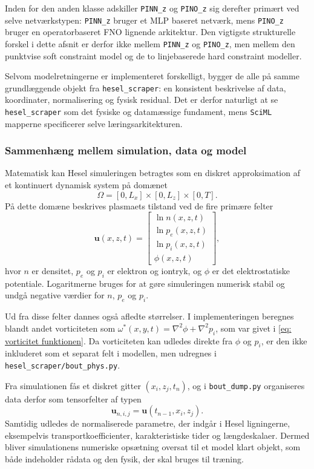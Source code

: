 Inden for den anden klasse adskiller \texttt{PINN\_z} og \texttt{PINO\_z} sig derefter primært ved selve netværkstypen: \texttt{PINN\_z} bruger et MLP baseret netværk, mens \texttt{PINO\_z} bruger en operatorbaseret FNO lignende arkitektur. Den vigtigste strukturelle forskel i dette afsnit er derfor ikke mellem \texttt{PINN\_z} og \texttt{PINO\_z}, men mellem den punktvise soft constraint model og de to linjebaserede hard constraint modeller.

Selvom modelretningerne er implementeret forskelligt, bygger de alle på samme grundlæggende objekt fra \texttt{hesel\_scraper}: en konsistent beskrivelse af data, koordinater, normalisering og fysisk residual. Det er derfor naturligt at se \texttt{hesel\_scraper} som det fysiske og datamæssige fundament, mens \texttt{SciML} mapperne specificerer selve læringsarkitekturen.

\subsubsection{Sammenhæng mellem simulation, data og model}
Matematisk kan Hesel  simuleringen betragtes som en diskret approksimation af et kontinuert dynamisk system på domænet
\[
\Omega = [0,L_x]\times[0,L_z]\times[0,T].
\]
På dette domæne beskrives plasmaets tilstand ved de fire primære felter
\[
\mathbf{u}(x,z,t)
=
\begin{bmatrix}
\ln n(x,z,t)\\
\ln p_e(x,z,t)\\
\ln p_i(x,z,t)\\
\phi(x,z,t)
\end{bmatrix},
\]
hvor \(n\) er densitet, \(p_e\) og \(p_i\) er elektron og iontryk, og \(\phi\) er det elektrostatiske potentiale. Logaritmerne bruges for at gøre simuleringen numerisk stabil og undgå negative værdier for \(n\), \(p_e\) og \(p_i\).

Ud fra disse felter dannes også afledte størrelser. I implementeringen beregnes blandt andet vorticiteten som $\omega^*(x,y,t) = \nabla^2\phi + \nabla^2 p_i$, som var givet i \eqref{eq: vorticitet funktionen}.
Da vorticiteten kan udledes direkte fra $\phi$ og $p_i$, er den ikke inkluderet som et separat felt i modellen, men udregnes i \texttt{hesel\_scraper/bout\_phys.py}.

Fra simulationen fås et diskret gitter \((x_i,z_j,t_n)\), og i \texttt{bout\_dump.py} organiseres data derfor som tensorfelter af typen
\[
\mathbf{u}_{n,i,j} = \mathbf{u}(t_{n-1}, x_i, z_j).
\]
Samtidig udledes de normaliserede parametre, der indgår i Hesel ligningerne, eksempelvis transportkoefficienter, karakteristiske tider og længdeskalaer. Dermed bliver simulationens numeriske opsætning oversat til et model klart objekt, som både indeholder rådata og den fysik, der skal bruges til træning.

